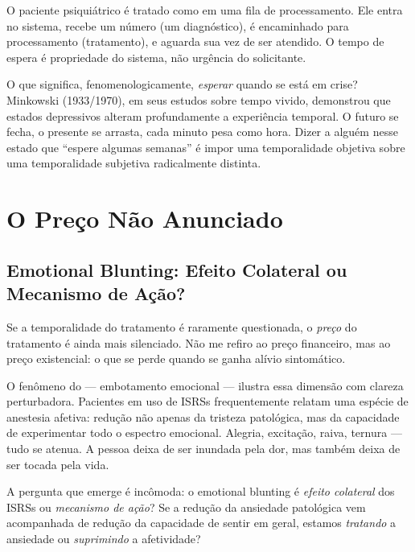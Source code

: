 O paciente psiquiátrico é tratado como  em uma fila de processamento. Ele entra no sistema, recebe um número (um diagnóstico), é encaminhado para processamento (tratamento), e aguarda sua vez de ser atendido. O tempo de espera é propriedade do sistema, não urgência do solicitante.

O que significa, fenomenologicamente, \textit{esperar} quando se está em crise? Minkowski (1933/1970), em seus estudos sobre tempo vivido, demonstrou que estados depressivos alteram profundamente a experiência temporal. O futuro se fecha, o presente se arrasta, cada minuto pesa como hora. Dizer a alguém nesse estado que \enquote{espere algumas semanas} é impor uma temporalidade objetiva sobre uma temporalidade subjetiva radicalmente distinta.

\section{O Preço Não Anunciado}
\label{sec:preco-nao-anunciado}

\subsection{Emotional Blunting: Efeito Colateral ou Mecanismo de Ação?}

Se a temporalidade do tratamento é raramente questionada, o \textit{preço} do tratamento é ainda mais silenciado. Não me refiro ao preço financeiro, mas ao preço existencial: o que se perde quando se ganha alívio sintomático.

O fenômeno do  --- embotamento emocional --- ilustra essa dimensão com clareza perturbadora. Pacientes em uso de ISRSs frequentemente relatam uma espécie de anestesia afetiva: redução não apenas da tristeza patológica, mas da capacidade de experimentar todo o espectro emocional. Alegria, excitação, raiva, ternura --- tudo se atenua. A pessoa deixa de ser inundada pela dor, mas também deixa de ser tocada pela vida.

A pergunta que emerge é incômoda: o emotional blunting é \textit{efeito colateral} dos ISRSs ou \textit{mecanismo de ação}? Se a redução da ansiedade patológica vem acompanhada de redução da capacidade de sentir em geral, estamos \textit{tratando} a ansiedade ou \textit{suprimindo} a afetividade?

